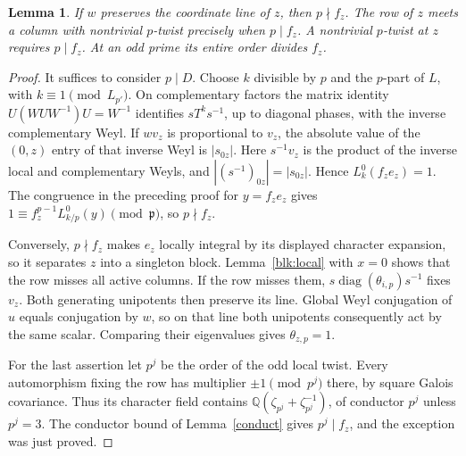 \documentclass[11pt]{amsart}
\numberwithin{equation}{section}
\newtheorem{lemma}[theorem]{Lemma}
\begin{document}
\begin{lemma}\label{blk:admissible}
If $w$ preserves the coordinate line of $z$, then $p\nmid f_z$. The row of $z$ meets a column with nontrivial $p$-twist precisely when $p\mid f_z$. A nontrivial $p$-twist at $z$ requires $p\mid f_z$. At an odd prime its entire order divides $f_z$.
\end{lemma}
\begin{proof}
It suffices to consider $p\mid D$. Choose $k$ divisible by $p$ and the $p$-part of $L$, with $k\equiv1\pmod{L_{p'}}$. On complementary factors the matrix identity $U(WUW^{-1})U=W^{-1}$ identifies $sT^ks^{-1}$, up to diagonal phases, with the inverse complementary Weyl. If $wv_z$ is proportional to $v_z$, the absolute value of the $(0,z)$ entry of that inverse Weyl is $|s_{0z}|$. Here $s^{-1}v_z$ is the product of the inverse local and complementary Weyls, and $|(s^{-1})_{0z}|=|s_{0z}|$. Hence $L_k^0(f_ze_z)=1$. The congruence in the preceding proof for $y=f_ze_z$ gives $1\equiv f_z^{p-1}L_{k/p}^0(y)\pmod{\mathfrak p}$, so $p\nmid f_z$.

Conversely, $p\nmid f_z$ makes $e_z$ locally integral by its displayed character expansion, so it separates $z$ into a singleton block. Lemma~\ref{blk:local} with $x=0$ shows that the row misses all active columns. If the row misses them, $s\operatorname{diag}(\theta_{i,p})s^{-1}$ fixes $v_z$. Both generating unipotents then preserve its line. Global Weyl conjugation of $u$ equals conjugation by $w$, so on that line both unipotents consequently act by the same scalar. Comparing their eigenvalues gives $\theta_{z,p}=1$.

For the last assertion let $p^j$ be the order of the odd local twist. Every automorphism fixing the row has multiplier $\pm1\pmod{p^j}$ there, by square Galois covariance. Thus its character field contains $\mathbb Q(\zeta_{p^j}+\zeta_{p^j}^{-1})$, of conductor $p^j$ unless $p^j=3$. The conductor bound of Lemma~\ref{conduct} gives $p^j\mid f_z$, and the exception was just proved.
\end{proof}
\end{document}

